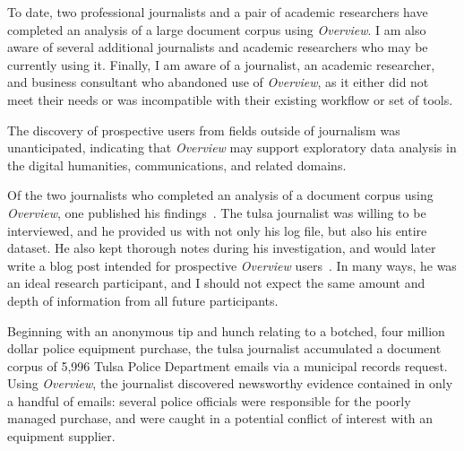 To date, two professional journalists and a pair of academic researchers have completed an analysis of a large document corpus using {\it Overview}. 
I am also aware of several additional journalists and academic researchers who may be currently using it. 
Finally, I am aware of a journalist, an academic researcher, and business consultant who abandoned use of {\it Overview}, as it either did not meet their needs or was incompatible with their existing workflow or set of tools.

The discovery of prospective users from fields outside of journalism was unanticipated, indicating that {\it Overview} may support exploratory data analysis in the digital humanities, communications, and related domains.

Of the two journalists who completed an analysis of a document corpus using {\it Overview}, one published his findings~\cite{Wade2012}. The {\sc tulsa} journalist was willing to be interviewed, and he provided us with not only his log file, but also his entire dataset. 
He also kept thorough notes during his investigation, and would later write a blog post intended for prospective {\it Overview} users~\cite{Wade2012a}. 
In many ways, he was an ideal research participant, and I should not expect the same amount and depth of information from all future participants. 

Beginning with an anonymous tip and hunch relating to a botched, four million dollar police equipment purchase, the {\sc tulsa} journalist accumulated a document corpus of 5,996 Tulsa Police Department emails via a municipal records request. 
Using {\it Overview}, the journalist discovered newsworthy evidence contained in only a handful of emails: several police officials were responsible for the poorly managed purchase, and were caught in a potential conflict of interest with an equipment supplier.

